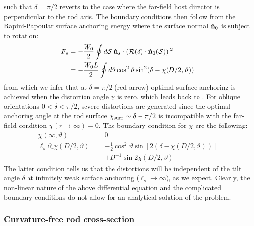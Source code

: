\eeq
such that $\delta = \pi/2$ reverts to the case where the far-field host  director is perpendicular to the rod axis. The boundary conditions then follow from the Rapini-Papoular surface anchoring energy where the surface normal ${\bf \hat{n}}_{0}$ is subject to rotation:
\begin{align}
F_{s} &= -\frac{W_{0}}{2} \oint d{\mathcal S}  [{\bf \hat{n}}_{s} \cdot  (\mathcal{R} ( \delta ) \cdot  {\bf \hat{n}}_{0}({\mathcal S}))]^{2} \nonumber \\
& = -\frac{  W_{0} L}{2 } \oint d \vartheta \cos^{2} \vartheta \sin^{2}(\delta - \chi(D/2, \vartheta))
\label{raporot}
\end{align}
from which we infer that at $\delta = \pi/2$ (red arrow) optimal surface anchoring is achieved  when the  distortion angle $\chi $ is zero, which leads back to . For oblique orientations $0<\delta < \pi/2$, severe distortions are generated since the optimal anchoring angle at the rod surface $\chi_{\rm surf} \sim \delta - \pi/2$ is incompatible with the far-field condition $\chi(r \rightarrow \infty) =0$.
The boundary condition for $\chi$ are the following:
\begin{align}
\chi(  \infty, \vartheta ) = & 0 \nonumber \\
\ell_{s} \partial_{r} \chi(D/2, \vartheta ) = & - \frac{1}{2 } \cos^{2} \vartheta \sin [2(\delta - \chi(D/2, \vartheta))] \nonumber \\
& + D^{-1} \sin 2 \chi(D/2, \vartheta)
\end{align}
The latter condition tells us that the distortions will be independent of the tilt angle $\delta$ at infinitely weak surface anchoring ($\ell_{s} \rightarrow \infty$), as we expect.
Clearly, the non-linear nature of the above differential equation and the complicated boundary conditions do not allow for an analytical solution of the problem.

\subsubsection{Curvature-free rod cross-section}

